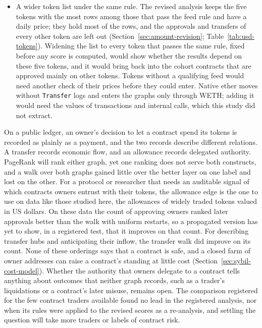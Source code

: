 \begin{itemize}
\item A wider token list under the same rule. The revised analysis keeps the five tokens with the most rows among those that pass the feed rule and have a daily price; they hold most of the rows, and the approvals and transfers of every other token are left out (Section~\ref{sec:amount-revision}; Table~\ref{tab:usd-tokens}). Widening the list to every token that passes the same rule, fixed before any score is computed, would show whether the results depend on these five tokens, and it would bring back into the cohort contracts that are approved mainly on other tokens. Tokens without a qualifying feed would need another check of their prices before they could enter. Native ether moves without \texttt{Transfer} logs and enters the graphs only through WETH; adding it would need the values of transactions and internal calls, which this study did not extract.
\end{itemize}


On a public ledger, an owner's decision to let a contract spend its tokens is recorded as plainly as a payment, and the two records describe different relations. A transfer records economic flow, and an allowance records delegated authority. PageRank will rank either graph, yet one ranking does not serve both constructs, and a walk over both graphs gained little over the better layer on one label and lost on the other. For a protocol or researcher that needs an auditable signal of which contracts owners entrust with their tokens, the allowance edge is the one to use on data like those studied here, the allowances of widely traded tokens valued in US dollars. On these data the count of approving owners ranked later approvals better than the walk with uniform restarts, so a propagated version has yet to show, in a registered test, that it improves on that count. For describing transfer hubs and anticipating their inflow, the transfer walk did improve on its count. None of these orderings says that a contract is safe, and a closed farm of owner addresses can raise a contract's standing at little cost (Section~\ref{sec:sybil-cost-model}). Whether the authority that owners delegate to a contract tells anything about outcomes that neither graph records, such as a trader's liquidations or a contract's later misuse, remains open. The comparison registered for the few contract traders available found no lead in the registered analysis, nor when its rules were applied to the revised scores as a re-analysis, and settling the question will take more traders or labels of contract risk.
